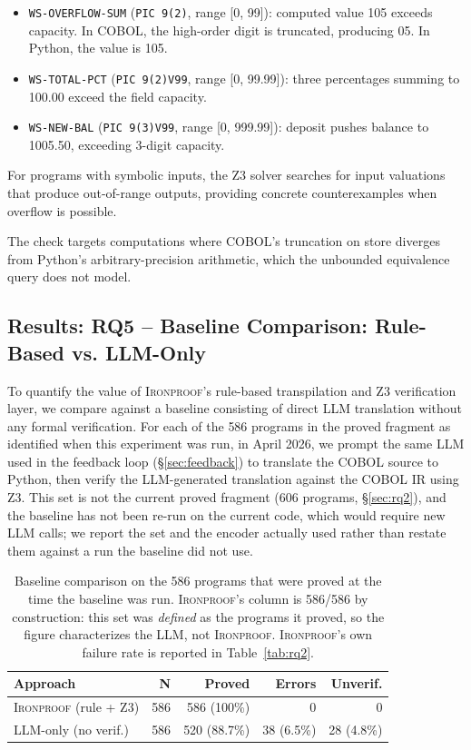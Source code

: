\documentclass[sigconf,nonacm]{acmart}
\begin{document}
\begin{itemize}
  \item \texttt{WS-OVERFLOW-SUM} (\texttt{PIC 9(2)}, range [0, 99]): computed value 105 exceeds capacity. In COBOL, the high-order digit is truncated, producing 05. In Python, the value is 105.
  \item \texttt{WS-TOTAL-PCT} (\texttt{PIC 9(2)V99}, range [0, 99.99]): three percentages summing to 100.00 exceed the field capacity.
  \item \texttt{WS-NEW-BAL} (\texttt{PIC 9(3)V99}, range [0, 999.99]): deposit pushes balance to 1005.50, exceeding 3-digit capacity.
\end{itemize}

For programs with symbolic inputs, the Z3 solver searches for input valuations that produce out-of-range outputs, providing concrete counterexamples when overflow is possible.

The check targets computations where COBOL's truncation on store diverges from Python's arbitrary-precision arithmetic, which the unbounded equivalence query does not model.

\subsection{Results: RQ5 -- Baseline Comparison: Rule-Based vs. LLM-Only}\label{sec:rq6}

To quantify the value of \textsc{Ironproof}'s rule-based transpilation and Z3 verification layer, we compare against a baseline consisting of direct LLM translation without any formal verification. For each of the 586 programs in the proved fragment as identified when this experiment was run, in April 2026, we prompt the same LLM used in the feedback loop (\S\ref{sec:feedback}) to translate the COBOL source to Python, then verify the LLM-generated translation against the COBOL IR using Z3. This set is not the current proved fragment (606 programs, \S\ref{sec:rq2}), and the baseline has not been re-run on the current code, which would require new LLM calls; we report the set and the encoder actually used rather than restate them against a run the baseline did not use.

\begin{table}[t]
\centering
\caption{Baseline comparison on the 586 programs that were proved at the time the baseline was run. \textsc{Ironproof}'s column is 586/586 by construction: this set was \emph{defined} as the programs it proved, so the figure characterizes the LLM, not \textsc{Ironproof}. \textsc{Ironproof}'s own failure rate is reported in Table~\ref{tab:rq2}.}
\label{tab:rq6}
\small
\setlength{\tabcolsep}{3.5pt}
\begin{tabular}{@{}lrrrr@{}}
\toprule
\textbf{Approach} & \textbf{N} & \textbf{Proved} & \textbf{Errors} & \textbf{Unverif.} \\
\midrule
\textsc{Ironproof} (rule + Z3) & 586 & 586 (100\%)  & 0          & 0 \\
LLM-only (no verif.)        & 586 & 520 (88.7\%) & 38 (6.5\%) & 28 (4.8\%) \\
\bottomrule
\end{tabular}
\end{table}
\end{document}

